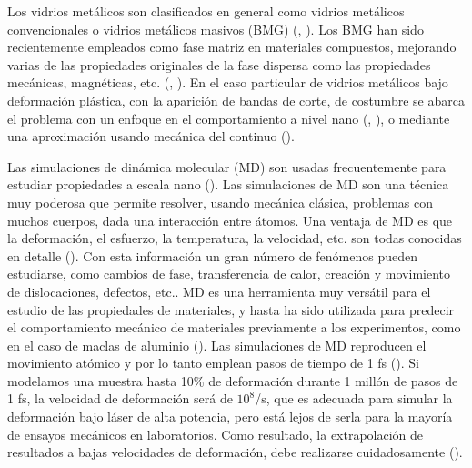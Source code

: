 Los vidrios metálicos son clasificados en general como vidrios metálicos convencionales o vidrios metálicos masivos (BMG) (\cite{wang04}, \cite{miller07}). Los BMG han sido recientemente empleados como fase matriz en materiales compuestos, mejorando varias de las propiedades originales de la fase dispersa como las propiedades mecánicas, magnéticas, etc. (\cite{telford04}, \cite{lu11}). En el caso particular de vidrios metálicos bajo deformación plástica, con la aparición de bandas de corte, de costumbre se abarca el problema con un enfoque en el comportamiento a nivel nano (\cite{ogata06}, \cite{guan10}), o mediante una aproximación usando mecánica del continuo (\cite{malvern69}).


Las simulaciones de dinámica molecular (MD) son usadas frecuentemente para estudiar propiedades a escala nano (\cite{allen87}). Las simulaciones de MD son una técnica muy poderosa que permite resolver, usando mecánica clásica, problemas con muchos cuerpos, dada una interacción entre átomos. Una ventaja de MD es que la deformación, el esfuerzo, la temperatura, la velocidad, etc. son todas conocidas en detalle (\cite{allen87}). Con esta información un gran número de fenómenos pueden estudiarse, como cambios de fase, transferencia de calor, creación y movimiento de dislocaciones, defectos, etc.. MD es una herramienta muy versátil para el estudio de las propiedades de materiales, y hasta ha sido utilizada para predecir el comportamiento mecánico de materiales previamente a los experimentos, como en el caso de maclas de aluminio (\cite{chen03}). Las simulaciones de MD reproducen el movimiento atómico y por lo tanto emplean pasos de tiempo de 1 fs (\cite{allen87}). Si modelamos una muestra hasta 10\% de deformación durante 1 millón de pasos de 1 fs, la velocidad de deformación será de $10^8$/s, que es adecuada para simular la deformación bajo láser de alta potencia, pero está lejos de serla para la mayoría de ensayos mecánicos en laboratorios. Como resultado, la extrapolación de resultados a bajas velocidades de deformación, debe realizarse cuidadosamente (\cite{bringa05}).


